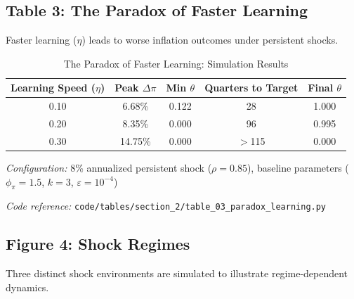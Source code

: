 \documentclass[11pt]{article}
\begin{document}
\subsection{Table 3: The Paradox of Faster Learning}

Faster learning ($\eta$) leads to worse inflation outcomes under persistent shocks.

\begin{table}[htbp]
\centering
\caption{The Paradox of Faster Learning: Simulation Results}
\label{tab:paradox_learning}
\begin{threeparttable}
\begin{tabular}{ccccc}
\toprule
Learning Speed ($\eta$) & Peak $\Delta\pi$ & Min $\theta$ & Quarters to Target & Final $\theta$ \\
\midrule
0.10 & 6.68\% & 0.122 & 28 & 1.000 \\
0.20 & 8.35\% & 0.000 & 96 & 0.995 \\
0.30 & 14.75\% & 0.000 & $>$115 & 0.000 \\
\bottomrule
\end{tabular}
\begin{tablenotes}
\small
\item \textit{Configuration:} 8\% annualized persistent shock ($\rho = 0.85$), baseline parameters ($\phi_\pi = 1.5$, $k = 3$, $\varepsilon = 10^{-4}$)
\item \textit{Code reference:} \texttt{code/tables/section\_2/table\_03\_paradox\_learning.py}
\end{tablenotes}
\end{threeparttable}
\end{table}

\subsection{Figure 4: Shock Regimes}

Three distinct shock environments are simulated to illustrate regime-dependent dynamics.
\end{document}
